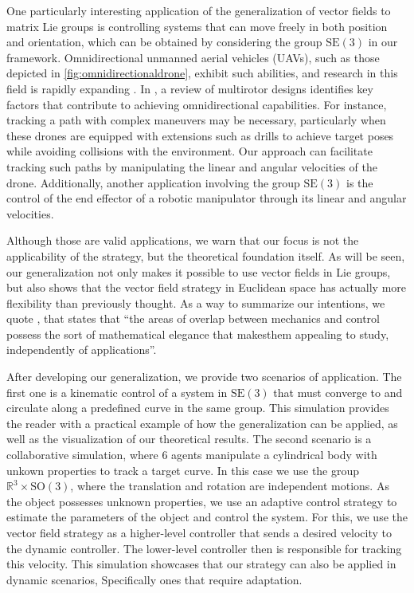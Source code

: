 One particularly interesting application of the generalization of vector fields to matrix Lie groups is controlling systems that can move freely in both position and orientation, which can be obtained by considering the group $\text{SE}(3)$ in our framework. Omnidirectional unmanned aerial vehicles (UAVs), such as those depicted in \cref{fig:omnidirectionaldrone}, exhibit such abilities, and research in this field is rapidly expanding \citep{kamel2018voliro,Aboudorra2023,HamandiOmni}. In \citet{hamandi2021design}, a review of multirotor designs identifies key factors that contribute to achieving omnidirectional capabilities. For instance, tracking a path with complex maneuvers may be necessary, particularly when these drones are equipped with extensions such as drills to achieve target poses while avoiding collisions with the environment. Our approach can facilitate tracking such paths by manipulating the linear and angular velocities of the drone. Additionally, another application involving the group $\text{SE}(3)$ is the control of the end effector of a robotic manipulator through its linear and angular velocities.

Although those are valid applications, we warn that our focus is not the applicability of the strategy, but the theoretical foundation itself. As will be seen, our generalization not only makes it possible to use vector fields in Lie groups, but also shows that the vector field strategy in Euclidean space has actually more flexibility than previously thought. As a way to summarize our intentions, we quote \citet{Bullo2004}, that states that ``the areas of overlap between mechanics and control possess the sort of mathematical elegance that makesthem appealing to study, independently of applications''.

After developing our generalization, we provide two scenarios of application. The first one is a kinematic control of a system in $\text{SE}(3)$ that must converge to and circulate along a predefined curve in the same group. This simulation provides the reader with a practical example of how the generalization can be applied, as well as the visualization of our theoretical results. The second scenario is a collaborative simulation, where $6$ agents manipulate a cylindrical body with unkown properties to track a target curve. In this case we use the group $\mathbb{R}^3\times\text{SO}(3)$, where the translation and rotation are independent motions. As the object possesses unknown properties, we use an adaptive control strategy to estimate the parameters of the object and control the system. For this, we use the vector field strategy as a higher-level controller that sends a desired velocity to the dynamic controller. The lower-level controller then is responsible for tracking this velocity. This simulation showcases that our strategy can also be applied in dynamic scenarios, Specifically ones that require adaptation.

